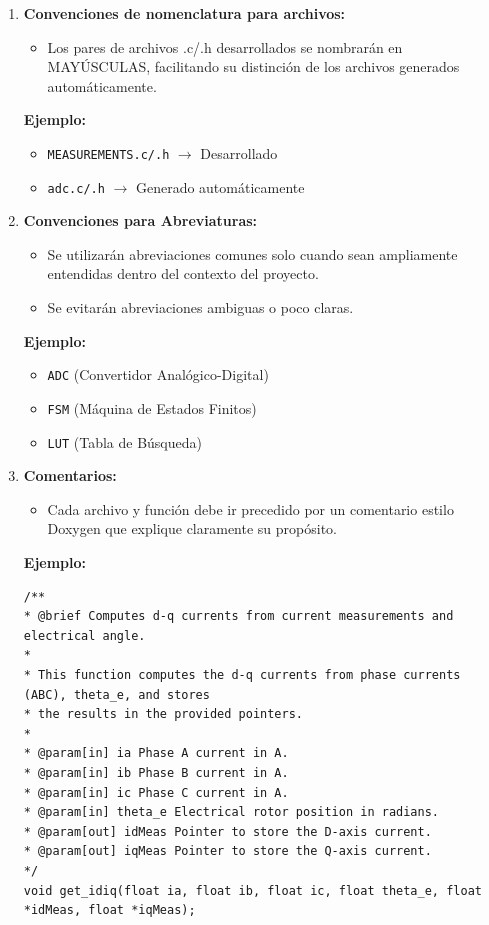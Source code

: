 \begin{enumerate}
\begin{itemize}
	\end{itemize}
	\item \textbf{Convenciones de nomenclatura para archivos:}
	\begin{itemize}
		\item Los pares de archivos .c/.h desarrollados se nombrarán en MAYÚSCULAS, facilitando su distinción de los archivos generados automáticamente.
	\end{itemize}
	\textbf{Ejemplo:}
	\begin{itemize}
		\item \texttt{MEASUREMENTS.c/.h} $\rightarrow$ Desarrollado
		\item \texttt{adc.c/.h} $\rightarrow$ Generado automáticamente
	\end{itemize}
	\item \textbf{Convenciones para Abreviaturas:}
	\begin{itemize}
		\item Se utilizarán abreviaciones comunes solo cuando sean ampliamente entendidas dentro del contexto del proyecto.
		\item Se evitarán abreviaciones ambiguas o poco claras.
	\end{itemize}
	\textbf{Ejemplo:}
	\begin{itemize}
		\item \texttt{ADC} (Convertidor Analógico-Digital)
		\item \texttt{FSM} (Máquina de Estados Finitos)
		\item \texttt{LUT} (Tabla de Búsqueda)
	\end{itemize}
	\item \textbf{Comentarios:}
	\begin{itemize}
		\item Cada archivo y función debe ir precedido por un comentario estilo Doxygen que explique claramente su propósito.
	\end{itemize}
	\textbf{Ejemplo:}
	{\small\begin{verbatim}		
/**
* @brief Computes d-q currents from current measurements and electrical angle.
*
* This function computes the d-q currents from phase currents (ABC), theta_e, and stores
* the results in the provided pointers.
*
* @param[in] ia Phase A current in A.
* @param[in] ib Phase B current in A.
* @param[in] ic Phase C current in A.
* @param[in] theta_e Electrical rotor position in radians.
* @param[out] idMeas Pointer to store the D-axis current.
* @param[out] iqMeas Pointer to store the Q-axis current.
*/
void get_idiq(float ia, float ib, float ic, float theta_e, float *idMeas, float *iqMeas);
	\end{verbatim}}
\end{enumerate}



